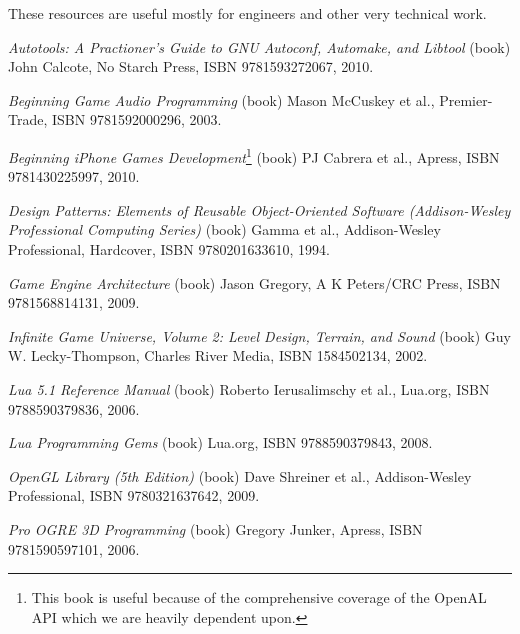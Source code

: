 
These resources are useful mostly for engineers and other very technical work.

\startitemize[4]
\item
{\it Autotools: A Practioner's Guide to GNU Autoconf, Automake, and Libtool} (book)\crlf
John Calcote, No Starch Press, ISBN 9781593272067, 2010.

\item
{\it Beginning Game Audio Programming} (book)\crlf
Mason McCuskey et al., Premier-Trade, ISBN 9781592000296, 2003.

\item
{\it Beginning iPhone Games Development}\footnote{This book is useful because of the comprehensive coverage of the OpenAL API which we are heavily dependent upon.} (book)\crlf
PJ Cabrera et al., Apress, ISBN 9781430225997, 2010.

\item
{\it Design Patterns: Elements of Reusable Object-Oriented Software (Addison-Wesley Professional Computing Series)} (book)\crlf
Gamma et al., Addison-Wesley Professional, Hardcover, ISBN 9780201633610, 1994.

\item
{\it Game Engine Architecture} (book)\crlf
Jason Gregory, A K Peters/CRC Press, ISBN 9781568814131, 2009.

\item
{\it Infinite Game Universe, Volume 2: Level Design, Terrain, and Sound} (book)\crlf
Guy W. Lecky-Thompson, Charles River Media, ISBN 1584502134, 2002.

\item
{\it Lua 5.1 Reference Manual} (book)\crlf
Roberto Ierusalimschy et al., Lua.org, ISBN 9788590379836, 2006.

\item
{\it Lua Programming Gems} (book)\crlf
Lua.org, ISBN 9788590379843, 2008.

\item
{\it OpenGL Library (5th Edition)} (book)\crlf
Dave Shreiner et al., Addison-Wesley Professional, ISBN 9780321637642, 2009.

\item
{\it Pro OGRE 3D Programming} (book)\crlf
Gregory Junker, Apress, ISBN 9781590597101, 2006.

